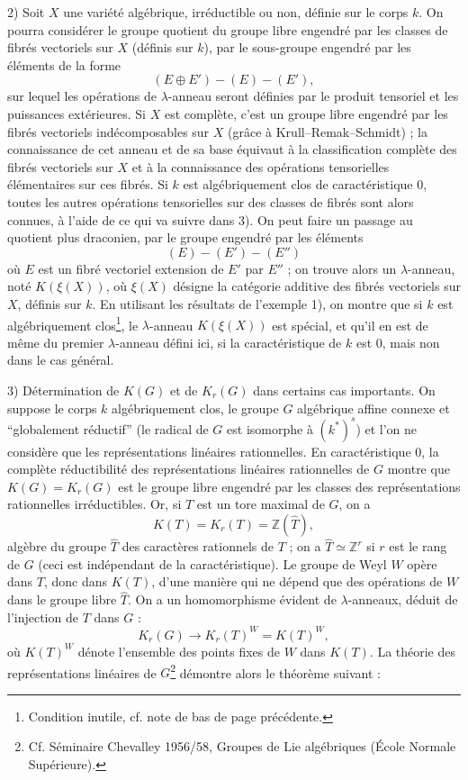 \documentclass[11pt]{article}
\providecommand{\Z}{\mathbb Z}
\providecommand{\That}{\widehat T}
\begin{document}
2) Soit $X$ une variété algébrique, irréductible ou non, définie sur le corps $k$. On pourra considérer le groupe quotient du groupe libre engendré par les classes de fibrés vectoriels sur $X$ (définis sur $k$), par le sous-groupe engendré par les éléments de la forme
\[
(E\oplus E')-(E)-(E'),
\]
sur lequel les opérations de $\lambda$-anneau seront définies par le produit tensoriel et les puissances extérieures. Si $X$ est complète, c'est un groupe libre engendré par les fibrés vectoriels indécomposables sur $X$ (grâce à Krull--Remak--Schmidt) ; la connaissance de cet anneau et de sa base équivaut à la classification complète des fibrés vectoriels sur $X$ et à la connaissance des opérations tensorielles élémentaires sur ces fibrés. Si $k$ est algébriquement clos de caractéristique $0$, toutes les autres opérations tensorielles sur des classes de fibrés sont alors connues, à l'aide de ce qui va suivre dans 3). On peut faire un passage au quotient plus draconien, par le groupe engendré par les éléments
\[
(E)-(E')-(E'')
\]
où $E$ est un fibré vectoriel extension de $E'$ par $E''$ ; on trouve alors un $\lambda$-anneau, noté $K(\xi(X))$, où $\xi(X)$ désigne la catégorie additive des fibrés vectoriels sur $X$, définis sur $k$. En utilisant les résultats de l'exemple 1), on montre que si $k$ est algébriquement clos\footnote{Condition inutile, cf. note de bas de page précédente.}, le $\lambda$-anneau $K(\xi(X))$ est spécial, et qu'il en est de même du premier $\lambda$-anneau défini ici, si la caractéristique de $k$ est $0$, mais non dans le cas général.

3) Détermination de $K(G)$ et de $K_r(G)$ dans certains cas importants. On suppose le corps $k$ algébriquement clos, le groupe $G$ algébrique affine connexe et ``globalement réductif'' (le radical de $G$ est isomorphe à $(k^*)^s$) et l'on ne considère que les représentations linéaires rationnelles. En caractéristique $0$, la complète réductibilité des représentations linéaires rationnelles de $G$ montre que $K(G)=K_r(G)$ est le groupe libre engendré par les classes des représentations rationnelles irréductibles. Or, si $T$ est un tore maximal de $G$, on a
\[
K(T)=K_r(T)=\Z(\That),
\]
algèbre du groupe $\That$ des caractères rationnels de $T$ ; on a $\That\simeq\Z^r$ si $r$ est le rang de $G$ (ceci est indépendant de la caractéristique). Le groupe de Weyl $W$ opère dans $T$, donc dans $K(T)$, d'une manière qui ne dépend que des opérations de $W$ dans le groupe libre $\That$. On a un homomorphisme évident de $\lambda$-anneaux, déduit de l'injection de $T$ dans $G$ :
\begin{equation}\tag{1.13}
K_r(G)\longrightarrow K_r(T)^W=K(T)^W,
\end{equation}
où $K(T)^W$ dénote l'ensemble des points fixes de $W$ dans $K(T)$. La théorie des représentations linéaires de $G$\footnote{Cf. Séminaire Chevalley 1956/58, Groupes de Lie algébriques (École Normale Supérieure).} démontre alors le théorème suivant :
\end{document}
